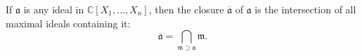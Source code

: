 If $\mathfrak{a}$ is any ideal in $\mathbb{C}[X_1, \ldots, X_n]$, then the closure $\overline{\mathfrak{a}}$ of $\mathfrak{a}$ is the intersection of all maximal ideals containing it:
$$\overline{\mathfrak{a}} = \bigcap_{\mathfrak{m} \supset \mathfrak{a}} \mathfrak{m}.$$
